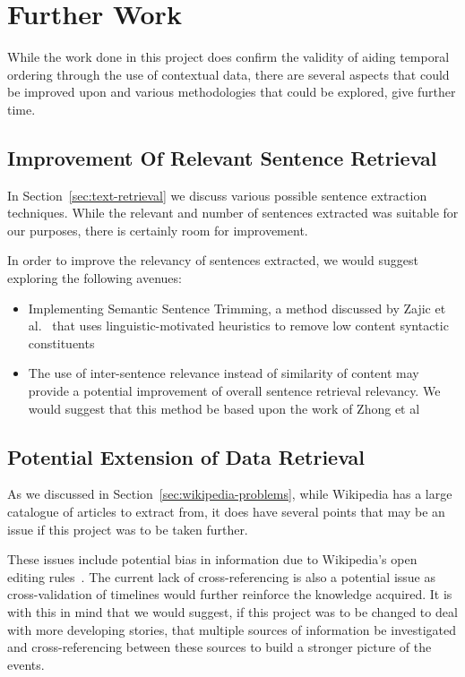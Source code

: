 \documentclass[bsc,frontabs,twoside,singlespacing,parskip,deptreport]{infthesis}     %
\begin{document}
\section{Further Work}
While the work done in this project does confirm the validity of aiding temporal ordering through the use of contextual
data, there are several aspects that could be improved upon and various methodologies that could be explored, give further
time.

\subsection{Improvement Of Relevant Sentence Retrieval}
In Section~\ref{sec:text-retrieval} we discuss various possible sentence extraction techniques.
While the relevant and number of sentences extracted was suitable for our purposes, there is certainly room for improvement.

In order to improve the relevancy of sentences extracted, we would suggest exploring the following avenues:
\begin{itemize}
\item Implementing Semantic Sentence Trimming, a method discussed by Zajic et al.~\cite{zajic2005sentence} that
  uses linguistic-motivated heuristics to remove low content syntactic constituents 

\item The use of inter-sentence relevance instead of similarity of content may provide a potential improvement of
  overall sentence retrieval relevancy. We would suggest that this method be based upon the work of Zhong et al~\cite{zhong2008practical}
\end{itemize}

\subsection{Potential Extension of Data Retrieval}
As we discussed in Section~\ref{sec:wikipedia-problems}, while Wikipedia has a large catalogue of articles to extract from,
it does have several points that may be an issue if this project was to be taken further.

These issues include potential bias in information due to Wikipedia's open editing rules~\cite{wikipediaeditrules}. The current lack of
cross-referencing is also a potential issue as cross-validation of timelines would further reinforce the knowledge acquired.
It is with this in mind that we would suggest, if this project was to be changed to deal with more developing stories, that
multiple sources of  information be investigated and cross-referencing between these sources to build a stronger picture of
the events.
\end{document}
